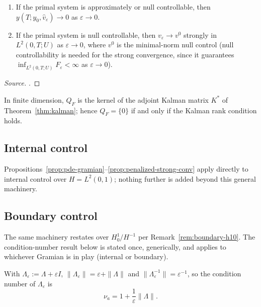 \begin{proposition}
  \label{prop:penalized-strong-conv}
  \begin{enumerate}[label=(\roman*)]
    \item If the primal system is approximately or null controllable, then
      $y(T;y_0,\hat v_\varepsilon) \to 0$ as $\varepsilon \to 0$.
    \item If the primal system is null controllable, then
      $v_\varepsilon \to v^0$ strongly in $L^2(0,T;U)$ as $\varepsilon\to0$,
      where $v^0$ is the minimal-norm null control (null controllability is
      needed for the strong convergence, since it guarantees
      $\inf_{L^2(0,T;U)}F_\varepsilon < \infty$ as $\varepsilon\to0$).
  \end{enumerate}
\end{proposition}
\begin{proof}[Source]
  \citet[Prop.~1.7]{boyer2013penalised}.
\end{proof}

\begin{remark}
  In finite dimension, $Q_F$ is the kernel of the adjoint Kalman matrix $K^*$
  of Theorem~\ref{thm:kalman}; hence $Q_F=\{0\}$ if and only if the Kalman
  rank condition holds.
\end{remark}

\subsection{Internal control}

Propositions~\ref{prop:pde-gramian}--\ref{prop:penalized-strong-conv} apply
directly to internal control over $H=L^2(0,1)$; nothing further is added
beyond this general machinery.

\subsection{Boundary control}

The same machinery restates over $H^1_0/H^{-1}$ per Remark~\ref{rem:boundary-h10}.
The condition-number result below is stated once, generically, and applies to
whichever Gramian is in play (internal or boundary).

\begin{proposition}
  \label{prop:condition-number}
  With $\Lambda_\varepsilon := \Lambda + \varepsilon I$,
  $\|\Lambda_\varepsilon\| = \varepsilon + \|\Lambda\|$ and
  $\|\Lambda_\varepsilon^{-1}\| = \varepsilon^{-1}$, so the condition number of
  $\Lambda_\varepsilon$ is
  \[
    \nu_a = 1 + \frac{1}{\varepsilon}\|\Lambda\|.
  \]
\end{proposition}

